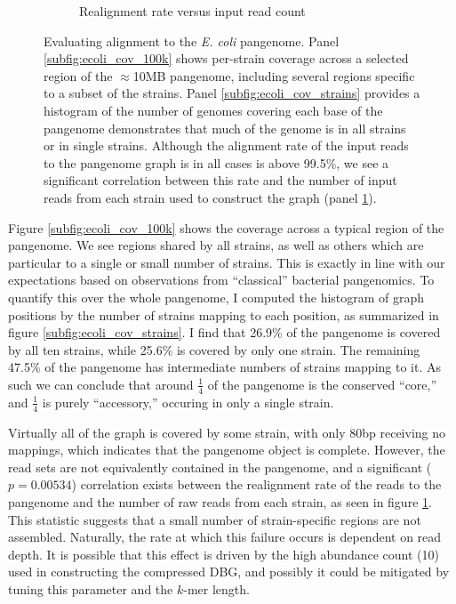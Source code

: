 \begin{figure}[htbp!]
\begin{subfigure}[t]{0.49\textwidth}
    \caption{Realignment rate versus input read count}
    \label{subfig:ecoli_realignment_vs_input}
  \end{subfigure}
  \caption[Evaluating alignment to the \emph{E. coli} pangenome.]{
    Evaluating alignment to the \emph{E. coli} pangenome.
    Panel \ref{subfig:ecoli_cov_100k} shows per-strain coverage across a selected region of the $\approx$10MB pangenome, including several regions specific to a subset of the strains.
    Panel \ref{subfig:ecoli_cov_strains} provides a histogram of the number of genomes covering each base of the pangenome demonstrates that much of the genome is in all strains or in single strains.
    Although the alignment rate of the input reads to the pangenome graph is in all cases is above 99.5\%, we see a significant correlation between this rate and the number of input reads from each strain used to construct the graph (panel \ref{subfig:ecoli_realignment_vs_input}).
  }
  \label{fig:ecoli_pangenome_alignment}
\end{figure}

Figure \ref{subfig:ecoli_cov_100k} shows the coverage across a typical region of the pangenome.
We see regions shared by all strains, as well as others which are particular to a single or small number of strains.
This is exactly in line with our expectations based on observations from ``classical'' bacterial pangenomics.
To quantify this over the whole pangenome, I computed the histogram of graph positions by the number of strains mapping to each position, as summarized in figure \ref{subfig:ecoli_cov_strains}.
I find that 26.9\% of the pangenome is covered by all ten strains, while 25.6\% is covered by only one strain.
The remaining 47.5\% of the pangenome has intermediate numbers of strains mapping to it.
As such we can conclude that around $\frac{1}{4}$ of the pangenome is the conserved ``core,'' and $\frac{1}{4}$ is purely ``accessory,'' occuring in only a single strain.

Virtually all of the graph is covered by some strain, with only 80bp receiving no mappings, which indicates that the pangenome object is complete.
However, the read sets are not equivalently contained in the pangenome, and a significant ($p=0.00534$) correlation exists between the realignment rate of the reads to the pangenome and the number of raw reads from each strain, as seen in figure \ref{subfig:ecoli_realignment_vs_input}.
This statistic suggests that a small number of strain-specific regions are not assembled.
Naturally, the rate at which this failure occurs is dependent on read depth.
It is possible that this effect is driven by the high abundance count (10) used in constructing the compressed DBG, and possibly it could be mitigated by tuning this parameter and the $k$-mer length.

